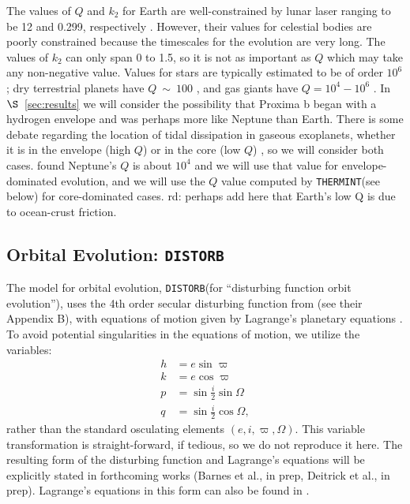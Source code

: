 \documentclass[preprint,12pt]{aastex}
\newcommand{\xxx}[1]{{\color{red} #1}} %
\def\eg{{\it e.g.\ }}
\def\distorb{\texttt{\footnotesize{DISTORB}}\xspace}
\def\thermint{\texttt{\footnotesize{THERMINT}}\xspace}
\begin{document}
The values of $Q$ and $k_2$ for Earth are well-constrained by lunar
laser ranging \citep{Dickey94} to be 12 and 0.299, respectively
\citep{Williams78,Yoder95}. However, their values for celestial bodies
are poorly constrained because the timescales for the evolution are
very long. The values of $k_2$ can only span 0 to 1.5, so it is not as
important as $Q$ which may take any non-negative value. Values for
stars are typically estimated to be of order $10^6$
\citep[\eg][]{Jackson09}; dry terrestrial planets have $Q~\sim~100$
\citep{Yoder95,Henning09}, and gas giants have $Q=10^4-10^6$
\citep{AksnesFranklin01,Jackson08a}. In $\S$~\ref{sec:results} we
will consider the possibility that Proxima b began with a hydrogen
envelope and was perhaps more like Neptune than Earth. There is some
debate regarding the location of tidal dissipation in gaseous
exoplanets, whether it is in the envelope (high $Q$) or in the core
(low $Q$) \citep[\eg][]{StorchLai14}, so we will consider both
cases. \cite{ZhangHamilton08} found Neptune's $Q$ is about $10^4$ and
we will use that value for envelope-dominated evolution, and we will
use the $Q$ value computed by \thermint (see below) for core-dominated cases.
\xxx{rd: perhaps add here that Earth's low Q is due to ocean-crust friction.}

\subsection{Orbital Evolution: \distorb}
\label{sec:models:distorb}
The model for orbital evolution, \distorb (for ``disturbing function orbit evolution''), 
uses the 4th order secular disturbing function from \cite{MurrayDermott99} 
(see their Appendix B), with equations of motion given by Lagrange's planetary 
equations \citep[again, see][]{MurrayDermott99}.
To avoid potential singularities in the equations of motion, we utilize 
the variables:
\begin{align}
h & = e \sin{\varpi} \\
k & = e \cos{\varpi} \\
p & = \sin{\frac{i}{2}} \sin{\Omega} \label{eqnp}\\
q & = \sin{\frac{i}{2}} \cos{\Omega} \label{eqnq},
\end{align}
rather than the standard osculating elements $(e,i,\varpi,\Omega)$. This 
variable transformation is straight-forward, if tedious, so we do not 
reproduce it here. The resulting form of the disturbing function and 
Lagrange's equations will be explicitly stated in forthcoming works (Barnes
 et al., in prep, Deitrick et al., in prep). Lagrange's equations in this form 
can also be found in \cite{Berger1991}. 
\end{document}
